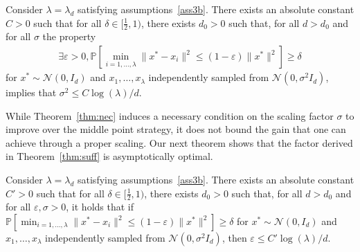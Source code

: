\begin{thm}
\label{thm:nec}
Consider $\lambda=\lambda_d$ satisfying assumptions~\eqref{ass3b}. %
There exists an absolute constant $C>0$ such that for all $\delta\in[\frac12,1)$, there exists $d_0>0$ such that, for all $d>d_0$ and for all $\sigma$ the property 
\begin{align}
\label{eq6bis}
  \exists \varepsilon>0,\mathbb{P}\left[\min_{i=1,\ldots,\lambda}\lVert x^*-x_i\rVert^2 \leq \left(1-\varepsilon\right)\lVert x^*\rVert^2\right]\geq \delta
\end{align}
for $x^* \sim \mathcal{N}(0,I_d)$ and $x_1,\ldots, x_{\lambda}$ independently sampled from $\mathcal{N}(0,\sigma^2 I_d)$,
implies that $\sigma^2 \leq C \log(\lambda)/d$.
\end{thm}
While Theorem~\ref{thm:nec} induces a necessary condition on the scaling factor $\sigma$ to improve over the middle point strategy, it does not bound the gain that one can achieve through a proper scaling. Our next theorem shows that the factor derived in Theorem~\ref{thm:suff} is asymptotically optimal. 
\begin{thm}
Consider $\lambda=\lambda_d$ satisfying assumptions~\eqref{ass3b}. %
There exists an absolute constant $C'>0$ such that for all $\delta\in[\frac12,1)$, there exists $d_0>0$ such that, for all $d>d_0$ and for all $\varepsilon,\sigma>0$, it holds that if $\mathbb{P}\left[\min_{i=1,\ldots,\lambda}\lVert x^*-x_i\rVert^2\leq \left(1-\varepsilon\right)\lVert x^*\rVert^2\right]\geq \delta$
for $x^* \sim \mathcal{N}(0,I_d)$ and $x_1,\ldots, x_{\lambda}$ independently sampled from $\mathcal{N}(0,\sigma^2 I_d)$,
then $\varepsilon\leq C' \log(\lambda)/d$.
\label{thm:approx}
\end{thm}
